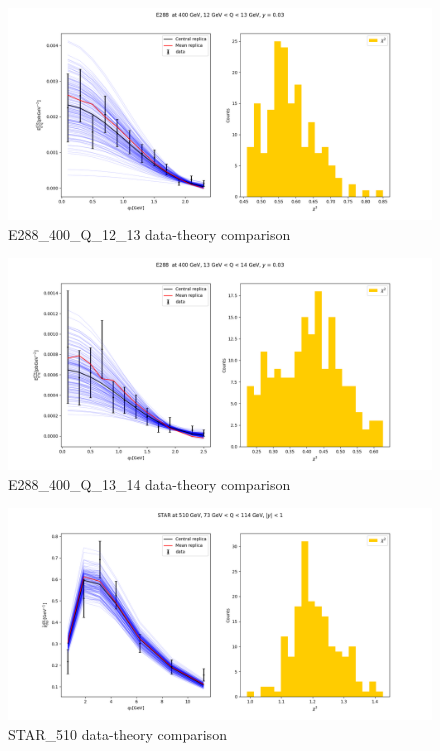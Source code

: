 \documentclass[
]{article}
\begin{document}
\begin{figure}
\centering
\includegraphics{pngplots/E288_400_Q_12_13.png}
\caption{E288\_400\_Q\_12\_13 data-theory comparison}
\end{figure}

\begin{figure}
\centering
\includegraphics{pngplots/E288_400_Q_13_14.png}
\caption{E288\_400\_Q\_13\_14 data-theory comparison}
\end{figure}

\begin{figure}
\centering
\includegraphics{pngplots/STAR_510.png}
\caption{STAR\_510 data-theory comparison}
\end{figure}
\end{document}
